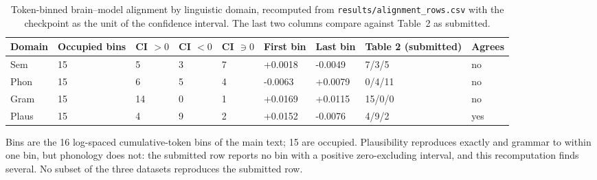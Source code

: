 \begin{table}[t]
\centering
\small
\begin{tabular}{lllllllll}
\toprule
Domain & Occupied bins & CI $>0$ & CI $<0$ & CI $\ni 0$ & First bin & Last bin & Table 2 (submitted) & Agrees \\
\midrule
Sem & 15 & 5 & 3 & 7 & +0.0018 & -0.0049 & 7/3/5 & no \\
Phon & 15 & 6 & 5 & 4 & -0.0063 & +0.0079 & 0/4/11 & no \\
Gram & 15 & 14 & 0 & 1 & +0.0169 & +0.0115 & 15/0/0 & no \\
Plaus & 15 & 4 & 9 & 2 & +0.0152 & -0.0076 & 4/9/2 & yes \\
\bottomrule
\end{tabular}
\vspace{2pt}
\begin{minipage}{\linewidth}\footnotesize Bins are the 16 log-spaced cumulative-token bins of the main text; 15 are occupied. Plausibility reproduces exactly and grammar to within one bin, but phonology does not: the submitted row reports no bin with a positive zero-excluding interval, and this recomputation finds several. No subset of the three datasets reproduces the submitted row.\end{minipage}
\caption{Token-binned brain--model alignment by linguistic domain, recomputed from \texttt{results/alignment\_rows.csv} with the checkpoint as the unit of the confidence interval. The last two columns compare against Table~2 as submitted.}
\label{tab:t1}
\end{table}
